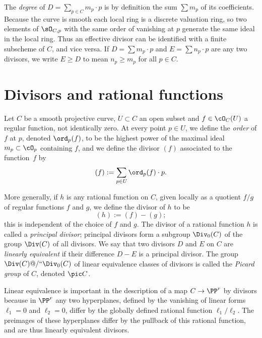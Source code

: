 The \emph{degree} of  $D = \sum_{p\in C} m_p\cdot p$ is by definition
%
the sum $\sum m_p$ of its coefficients. Because the curve is smooth
each local ring is a discrete valuation ring, so two elements of 
$\sO_{C,p}$ with the same order of vanishing at $p$ generate the same ideal in the local ring. Thus an effective divisor 
can be identified with a finite subscheme of $C$, and vice versa. If $D = \sum m_p\cdot p$ and $E = \sum n_p\cdot p$ are any two divisors, we write $E \geq D$ to mean $n_p \geq m_p$ for all $p \in C$.


\section{Divisors and rational functions}

Let $C$ be a smooth projective curve, $U \subset C$ an open subset and
$f \in \cO_C(U)$ a regular function, not identically zero. At every
point $p \in U$, we define the \emph{order} of $f$ at $p$, denoted
%
%
$\ord_p(f)$,
to be the highest power of the maximal ideal $m_p \subset
\cO_p$ containing $f$, and we define the divisor $(f)$ associated to
%
the function~$f$ by 
$$
(f) := \sum_{p \in U} \ord_p(f) \cdot p.
$$

More generally, if $h$ is any rational function on $C$, given locally as a quotient $f/g$ of regular functions $f$ and $g$, we define the divisor of $h$ to be
$$
(h) := (f) - (g);
$$
%
this is independent of the choice of $f$ and $g$. The divisor of a
%
rational function $h$ is called a \emph{principal divisor}; principal
divisors form a subgroup $\Div_0(C)$ of the group $\Div(C)$ of all
divisors. We say that two divisors $D$ and $E$ on $C$ are
\emph{linearly equivalent} if their difference $D-E$ is a principal
divisor. The group $\Div(C)@/` `\Div_0(C)$ of linear equivalence classes 
%
of divisors is called the \emph{Picard group} of $C$, denoted
%
$\pic C$.

Linear equivalence
%
is important in the description of a map $C\to \PP^{r}$ by divisors
because in $\PP^{r}$ any two hyperplanes, defined by the vanishing of linear forms  $\ell_{1}=0$ and $\ell_{2}=0$, differ by the globally defined rational
function $\ell_{1}/\ell_{2}$. The preimages of these hyperplanes
differ by the 
pullback of this rational function,
and are thus linearly equivalent divisors.

